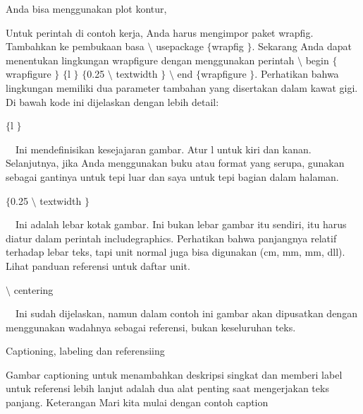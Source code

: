 \noindent
Anda bisa menggunakan plot kontur, \par
\vspace{22pt}
\noindent
Untuk perintah di contoh kerja, Anda harus mengimpor paket wrapfig. Tambahkan ke pembukaan basa  $  \setminus $ usepackage  $  \{  $wrapfig $  \}  $. Sekarang Anda dapat menentukan lingkungan wrapfigure dengan menggunakan perintah  $  \setminus $ begin  $  \{  $wrapfigure $  \}  $  $  \{  $l $  \}  $  $  \{  $0.25  $  \setminus $ textwidth $  \}  $  $  \setminus $ end  $  \{  $wrapfigure $  \}  $. Perhatikan bahwa lingkungan memiliki dua parameter tambahan yang disertakan dalam kawat gigi. Di bawah kode ini dijelaskan dengan lebih detail: \par
\vspace{12pt}
\noindent
 $  \{  $l $  \}  $ \par
\noindent
 $  $ $  $ $  $ $  $Ini mendefinisikan kesejajaran gambar. Atur l untuk kiri dan kanan. Selanjutnya, jika Anda menggunakan buku atau format yang serupa, gunakan sebagai gantinya untuk tepi luar dan saya untuk tepi bagian dalam halaman. \par
\vspace{12pt}
\noindent
 $  \{  $0.25  $  \setminus $ textwidth $  \}  $ \par
\noindent
 $  $ $  $ $  $ $  $Ini adalah lebar kotak gambar. Ini bukan lebar gambar itu sendiri, itu harus diatur dalam perintah includegraphics. Perhatikan bahwa panjangnya relatif terhadap lebar teks, tapi unit normal juga bisa digunakan (cm, mm, mm, dll). Lihat panduan referensi untuk daftar unit. \par
\vspace{12pt}
\noindent
 $  \setminus $ centering \par
\noindent
 $  $ $  $ $  $ $  $Ini sudah dijelaskan, namun dalam contoh ini gambar akan dipusatkan dengan menggunakan wadahnya sebagai referensi, bukan keseluruhan teks. \par
\vspace{12pt}
\vspace{12pt}
\vspace{16pt}
\noindent
Captioning, labeling dan referensiing \par
\vspace{12pt}
\noindent
Gambar captioning untuk menambahkan deskripsi singkat dan memberi label untuk referensi lebih lanjut adalah dua alat penting saat mengerjakan teks panjang. Keterangan Mari kita mulai dengan contoh caption \par
\vspace{36pt}
